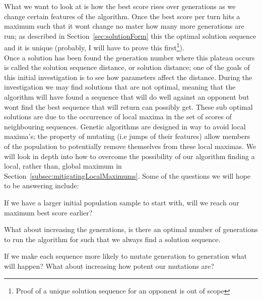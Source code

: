 
What we want to look at is how the best score rises over generations as we change certain features of the algorithm.
Once the best score per turn hits a maximum such that it wont change no mater how many more generations are run;
as described in Section~\ref{sec:solutionForm} this the optimal solution sequence and it is unique (probably, I will have to
prove this first\footnote{Proof of a unique solution sequence for an opponent is out of scope}).\\

Once a solution has been found the generation number where this plateau occurs is called the solution sequence distance, or solution distance;
one of the goals of this initial investigation is to see how parameters affect the distance.
During the investigation we may find solutions that are not optimal, meaning that the algorithm will have found a sequence that will do well against an opponent but wont find the best sequence that will return can possibly get.
These sub optimal solutions are due to the occurrence of local maxima in the set of scores of neighbouring sequences.
Genetic algorithms are designed in way to avoid local maxima's;
the property of mutating (i.e jumps of their features) allow members of the population to potentially remove themselves from these local maximas.
We will look in depth into how to overcome the possibility of our algorithm finding a local, rather than, global maximum in Section~\ref{subsec:mitigatingLocalMaximums}.
Some of the questions we will hope to be answering include:
\begin{itemize}
    \begin{item}
        If we have a larger initial population sample to start with, will we reach our maximum best score earlier?
    \end{item}
    \begin{item}
        What about increasing the generations, is there an optimal number of generations to run the algorithm for such that we always find a solution sequence.
    \end{item}
    \begin{item}
        If we make each sequence more likely to mutate generation to generation what will happen?
        What about increasing how potent our mutations are?
    \end{item}
\end{itemize}

